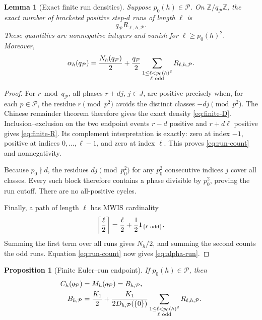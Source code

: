 \documentclass[11pt]{article}
\newtheorem{proposition}[theorem]{Proposition}
\newtheorem{lemma}[theorem]{Lemma}
\theoremstyle{definition}
\theoremstyle{remark}
\newcommand{\ind}{\mathbf 1}
\newcommand{\Z}{\mathbb Z}
\begin{document}
\begin{lemma}[Exact finite run densities]
\label{lem:finite-runs}
Suppose \(p_0(h)\in\mathcal P\).  On
\(\Z/q_{\mathcal P}\Z\), the exact number of bracketed positive
step-\(d\) runs of length \(\ell\) is
\begin{equation}
 q_{\mathcal P}R_{\ell,h,\mathcal P}.
 \label{eq:run-count}
\end{equation}
These quantities are nonnegative integers and vanish for
\(\ell\geq p_0(h)^2\).  Moreover,
\begin{equation}
 \alpha_h(q_{\mathcal P})
 =\frac{N_h(q_{\mathcal P})}{2}
 +\frac{q_{\mathcal P}}2
 \sum_{\substack{1\leq\ell<p_0(h)^2\\\ell\ {\rm odd}}}
 R_{\ell,h,\mathcal P}.
 \label{eq:alpha-run}
\end{equation}
\end{lemma}

\begin{proof}
For \(r\bmod q_{\mathcal P}\), all phases
\(r+dj\), \(j\in J\), are positive precisely when, for each
\(p\in\mathcal P\), the residue \(r\pmod{p^2}\) avoids the distinct
classes \(-dj\pmod{p^2}\).  The Chinese remainder theorem therefore gives
the exact density \eqref{eq:finite-D}.  Inclusion--exclusion on the two
endpoint events \(r-d\) positive and \(r+d\ell\) positive gives
\eqref{eq:finite-R}.  Its complement interpretation is exactly: zero at
index \(-1\), positive at indices \(0,\ldots,\ell-1\), and zero at index
\(\ell\).  This proves \eqref{eq:run-count} and nonnegativity.

Because \(p_0\nmid d\), the residues \(dj\pmod{p_0^2}\) for any
\(p_0^2\) consecutive indices \(j\) cover all classes.  Every such block
therefore contains a phase divisible by \(p_0^2\), proving the run cutoff.
There are no all-positive cycles.

Finally, a path of length \(\ell\) has MWIS cardinality
\[
 \left\lceil\frac\ell2\right\rceil
 =\frac\ell2+\frac12\ind_{\{\ell\ {\rm odd}\}}.
\]
Summing the first term over all runs gives \(N_h/2\), and summing the
second counts the odd runs.  Equation \eqref{eq:run-count} now gives
\eqref{eq:alpha-run}.
\end{proof}

\begin{proposition}[Finite Euler--run endpoint]
\label{prop:finite-endpoint}
If \(p_0(h)\in\mathcal P\), then
\begin{align}
 C_h(q_{\mathcal P})
 &=M_h(q_{\mathcal P})=B_{h,\mathcal P},
 \label{eq:finite-B-equality}\\
 B_{h,\mathcal P}
 &=\frac{K_1}{2}
 +\frac{K_1}{2D_{h,\mathcal P}(\{0\})}
 \sum_{\substack{1\leq\ell<p_0(h)^2\\\ell\ {\rm odd}}}
 R_{\ell,h,\mathcal P}.
 \label{eq:finite-B}
\end{align}
\end{proposition}
\end{document}
